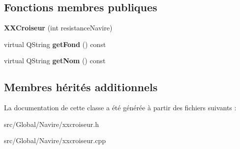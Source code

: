 \subsection*{Fonctions membres publiques}
\begin{DoxyCompactItemize}
\item 
{\bfseries X\+X\+Croiseur} (int resistance\+Navire)\hypertarget{class_x_x_croiseur_a675bb140d4a1134dd80310d5b8648309}{}\label{class_x_x_croiseur_a675bb140d4a1134dd80310d5b8648309}

\item 
virtual Q\+String {\bfseries get\+Fond} () const \hypertarget{class_x_x_croiseur_a08ff21525d08f37d960731bec2fe8a63}{}\label{class_x_x_croiseur_a08ff21525d08f37d960731bec2fe8a63}

\item 
virtual Q\+String {\bfseries get\+Nom} () const \hypertarget{class_x_x_croiseur_ac248c662075c43f55a6d2304c3fd03f6}{}\label{class_x_x_croiseur_ac248c662075c43f55a6d2304c3fd03f6}

\end{DoxyCompactItemize}
\subsection*{Membres hérités additionnels}


La documentation de cette classe a été générée à partir des fichiers suivants \+:\begin{DoxyCompactItemize}
\item 
src/\+Global/\+Navire/xxcroiseur.\+h\item 
src/\+Global/\+Navire/xxcroiseur.\+cpp\end{DoxyCompactItemize}
